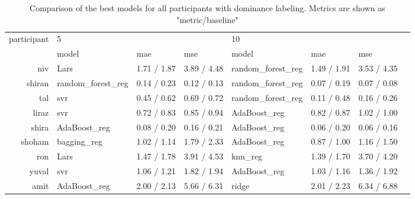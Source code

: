 \documentclass[../main.tex]{subfiles}
\begin{document}
\begin{table}[!h]
    \begin{tabular}{rlllllll}
        \toprule
        participant &  \multicolumn{3}{l}{5} & \multicolumn{3}{l}{10} \\
              &               model & mae & mse &              model & mae & mse \\
        \midrule
             niv &               Lars &         1.71 / 1.87 &        3.89 / 4.48 &  random\_forest\_reg &         1.49 / 1.91 &        3.53 / 4.35 \\
          shiran &  random\_forest\_reg &         0.14 / 0.23 &        0.12 / 0.13 &  random\_forest\_reg &         0.07 / 0.19 &        0.07 / 0.08 \\
             tal &                svr &         0.45 / 0.62 &        0.69 / 0.72 &  random\_forest\_reg &         0.11 / 0.48 &        0.16 / 0.26 \\
           liraz &                svr &         0.72 / 0.83 &        0.85 / 0.94 &       AdaBoost\_reg &         0.82 / 0.87 &        1.02 / 1.00 \\
           shira &       AdaBoost\_reg &         0.08 / 0.20 &        0.16 / 0.21 &       AdaBoost\_reg &         0.06 / 0.20 &        0.06 / 0.16 \\
          shoham &        bagging\_reg &         1.02 / 1.14 &        1.79 / 2.33 &       AdaBoost\_reg &         0.87 / 1.00 &        1.16 / 1.50 \\
             ron &               Lars &         1.47 / 1.78 &        3.91 / 4.53 &            knn\_reg &         1.39 / 1.70 &        3.70 / 4.20 \\
           yuval &                svr &         1.06 / 1.21 &        1.82 / 1.94 &       AdaBoost\_reg &         1.03 / 1.16 &        1.36 / 1.92 \\
            amit &       AdaBoost\_reg &         2.00 / 2.13 &        5.66 / 6.31 &              ridge &         2.01 / 2.23 &        6.34 / 6.88 \\
        \bottomrule
    \end{tabular}
    \caption{Comparison of the best models for all participants with dominance labeling. Metrics are shown as "metric/baseline"}  
\end{table}
\end{document}
